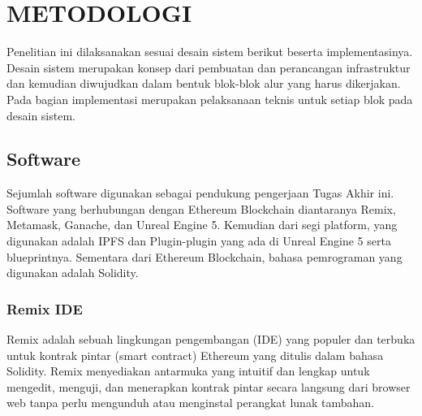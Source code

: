 \chapter{METODOLOGI}
\label{chap:desainimplementasi}


Penelitian ini dilaksanakan sesuai desain sistem berikut beserta implementasinya.
Desain sistem merupakan konsep dari pembuatan dan perancangan infrastruktur dan kemudian
diwujudkan dalam bentuk blok-blok alur yang harus dikerjakan. Pada bagian implementasi merupakan
pelaksanaan teknis untuk setiap blok pada desain sistem.



\section{Software}
\label{sec:software}

Sejumlah software digunakan sebagai pendukung pengerjaan Tugas Akhir ini.
Software yang berhubungan dengan Ethereum Blockchain diantaranya Remix,
Metamask, Ganache, dan Unreal Engine 5. Kemudian dari segi platform, yang digunakan adalah IPFS
dan Plugin-plugin yang ada di Unreal Engine 5 serta blueprintnya. Sementara dari Ethereum Blockchain,
bahasa pemrograman yang digunakan adalah Solidity.



\subsection{Remix IDE}
Remix adalah sebuah lingkungan pengembangan (IDE) yang populer dan terbuka untuk kontrak pintar (smart contract) Ethereum yang ditulis dalam bahasa Solidity. Remix menyediakan antarmuka yang intuitif dan lengkap untuk mengedit, menguji, dan menerapkan kontrak pintar secara langsung dari browser web tanpa perlu mengunduh atau menginstal perangkat lunak tambahan.

